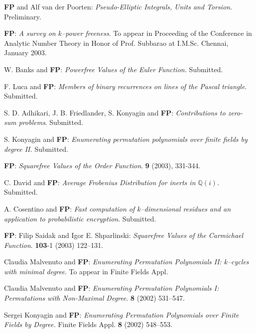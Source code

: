 \documentclass[12pt]{amsart}
\begin{document}
\begin{thebibliography}{10}

 \textbf{F\!P} and Alf van der Poorten:
\textit{Pseudo-Elliptic Integrals, Units and Torsion}.
Preliminary.

 \textbf{F\!P}: \textit{A survey on $k$--power freeness}.
To appear in Proceeding of the Conference in Analytic Number
Theory in Honor of Prof. Subbarao at I.M.Sc. Chennai, January
2003.\bigskip

 W. Banks and \textbf{F\!P}: \textit{Powerfree Values of the Euler Function.}
\newblock Submitted.\bigskip

 F. Luca  and \textbf{F\!P}: \textit{Members of binary recurrences on lines of the Pascal
triangle}.  \newblock Submitted.\bigskip

 S. D. Adhikari, J. B. Friedlander, S. Konyagin  and \textbf{F\!P}:
\textit{Contributions to zero-sum problems}. \newblock
Submitted.\bigskip

 S. Konyagin and \textbf{F\!P}: \textit{Enumerating permutation polynomials over finite
fields by degree II.} \newblock Submitted.\bigskip

 \textbf{F\!P}: \textit{Squarefree Values of the Order Function}.
 \textbf{9} (2003), 331-344.\bigskip

 C. David and \textbf{F\!P}: \textit{Average Frobenius Distribution for inerts in
$\mathbb Q(i)$}. \newblock Submitted.\bigskip

 A. Cosentino and \textbf{F\!P}: \textit{Fast
computation of $k$--dimensional residues and an application to
probabilistic encryption}. \newblock Submitted.\bigskip

 \textbf{F\!P}: Filip Saidak and Igor E. Shparlinski:
\textit{Squarefree Values of the Carmichael Function}.
 \textbf{103}-1 (2003) 122--131.\bigskip

 Claudia Malvenuto and \textbf{F\!P}:
\textit{Enumerating Permutation Polynomials II: $k$--cycles with
minimal degree}. \newblock To appear in {Finite Fields
Appl.}\bigskip

 Claudia Malvenuto and \textbf{F\!P}:
\textit{Enumerating Permutation Polynomials I: Permutations with
Non-Maximal Degree}.  \textbf{8}
(2002) 531--547.\bigskip

 Sergei Konyagin and \textbf{F\!P}: \textit{Enumerating
Permutation Polynomials over Finite Fields by Degree.} \newblock
{Finite Fields Appl.} \textbf{8} (2002) 548--553.\bigskip


\end{thebibliography}
\end{document}
